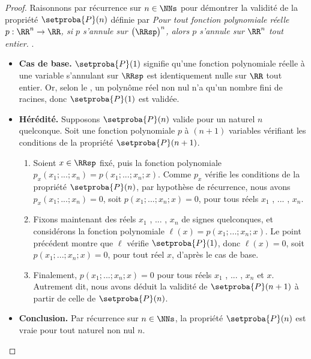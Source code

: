\begin{proof}
	Raisonnons par récurrence sur $n \in \NNs$ pour démontrer la validité de la propriété $\setproba{P}(n)$ définie par
	\emph{\og 
		Pour tout fonction polynomiale réelle $p: \RR^n \rightarrow \RR$,
		si $p$ s'annule sur $\big( \RRsp \big)^n$,
		alors $p$ s'annule sur $\RR^n$ tout entier. 
	\fg}\kern2pt.
	\begin{itemize}[label=\small\textbullet]
		\item \textbf{Cas de base.}
		$\setproba{P}(1)$ signifie qu'une fonction polynomiale réelle à une variable s'annulant sur $\RRsp$ est identiquement nulle sur $\RR$ tout entier.
		Or, selon le , un polynôme réel non nul n'a qu'un nombre fini de racines, donc $\setproba{P}(1)$ est validée.


		\item \textbf{Hérédité.}
		Supposons $\setproba{P}(n)$ valide pour un naturel $n$ quelconque.
		Soit une fonction polynomiale $p$ à $(n + 1)$ variables vérifiant les conditions de la propriété $\setproba{P}(n + 1)$.
		\begin{enumerate}
		    \item Soient $x \in \RRsp$ fixé, puis la fonction polynomiale $p_x(x_1 ; ... ; x_n) = p(x_1 ; ... ; x_n ; x)$.
		    Comme $p_x$ vérifie les conditions de la propriété $\setproba{P}(n)$, par hypothèse de récurrence, nous avons
		    $p_x(x_1 ; ... ; x_n) = 0$, soit $p(x_1 ; ... ; x_n ; x) = 0$, pour tous réels $x_1$ , ... , $x_n$.


		    \item Fixons maintenant des réels $x_1$ , ... , $x_n$ de signes quelconques, et considérons la fonction polynomiale $\ell(x) = p(x_1 ; ... ; x_n ; x)$.
		    Le point précédent montre que $\ell$ vérifie $\setproba{P}(1)$, donc $\ell(x) = 0$, soit $p(x_1 ; ... ; x_n ; x) = 0$, pour tout réel $x$, d'après le cas de base.


		    \item Finalement, $p(x_1 ; ... ; x_n ; x) = 0$ pour tous réels $x_1$ , ... , $x_n$ et $x$.
		    Autrement dit, nous avons déduit la validité de $\setproba{P}(n+1)$ à partir de celle de $\setproba{P}(n)$.
		\end{enumerate}
		
		
		\item \textbf{Conclusion.}
		Par récurrence sur $n \in \NNs$, la propriété $\setproba{P}(n)$ est vraie pour tout naturel non nul $n$.
	\end{itemize}

	\null\vspace{-6ex}
\end{proof}


